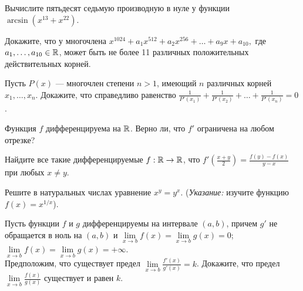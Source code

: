\documentclass[a4paper, 12pt]{article}
\newcommand{\0}[1]{\overline{#1}}
\begin{document}
Вычислите пятьдесят седьмую производную в нуле у функции
$\arcsin(x^{13}+x^{22})$.


Докажите, что у многочлена
$x^{1024}+ a_1x^{512} +a_2x^{256}+\dots + a_{9}x + a_{10},$
где $a_1,\dots, a_{10}\in\mathbb{R}$, может быть не более 11 различных
положительных действительных корней.


 Пусть $P(x)$ --- многочлен степени $n>1$, имеющий $n$ различных
корней $x_1, \dots ,x_n.$ Докажите, что справедливо равенство
$\frac{1}{P'(x_1)}+\frac{1}{P'(x_2)}+\dots+\frac{1}{P'(x_n)}=0$.





Функция $f$ дифференцируема на $\mathbb{R}$. Верно ли, что
$f'$ ограничена на любом отрезке?


Найдите все такие дифференцируемые $f:\mathbb{R}\rightarrow\mathbb{R}$,
что $f'(\frac{x+y}{2})=\frac{f(y)-f(x)}{y-x}$ при
любых $x\ne y$.





 Решите в натуральных числах уравнение $x^y=y^x$.
({\sl Указание:}
изучите функцию $f(x)=x^{1/x}$).

  Пусть функции $f$ и $g$
дифференцируемы на интервале $(a,b)$,
причем $g'$ не обращается в ноль на $(a,b)$ и
$\lim\limits_{x\rightarrow b}f(x)=\lim\limits_{x\rightarrow b}g(x)=0$;
$\lim\limits_{x\rightarrow b}f(x)=\lim\limits_{x\rightarrow b}g(x)=+\infty$.\\
Предположим, что существует предел
$\lim\limits_{x\to b}\frac{f'(x)}{g'(x)}=k$. Докажите, что предел
$\lim\limits_{x\to b}\frac{f(x)}{g(x)}$ существует и равен $k$.
\label{lop}
\end{document}

